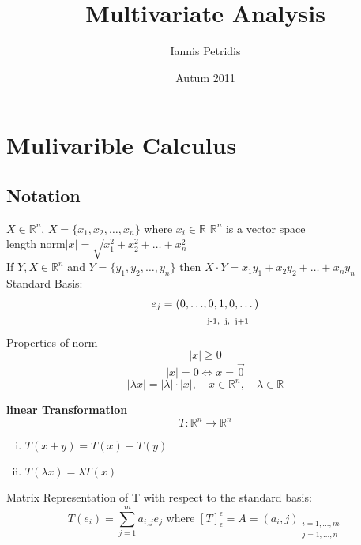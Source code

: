 \documentclass[12pt]{article}
\def\RR{\mathbb{R}}
\begin{document}
\title{Multivariate Analysis}
\author{Iannis Petridis}
\date{Autum 2011}
\maketitle

\tableofcontents
\setcounter{tocdepth}{4}
\newpage

\section{Mulivarible  Calculus}
\subsection{Notation}
$X\in\RR^{n}$, $ X=\{x_{1},x_{2},\dots,x_{n}\}$ where $x_{i}\in\RR$
$\RR^{n}$ is a vector space\\
length norm$|x|=\sqrt{x_1^2 + x_2^2 + \dots +x_n^2 }$\\
If $Y,X\in\RR^{n}$ and $ Y=\{y_{1},y_{2},\dots,y_{n}\}$ then $X \cdot Y=x_{1}y_{1}+ x_{2}y_{2} +\dots + x_{n}y_{n}$\\
Standard Basis:
\begin{align*}
  e_j=(0, \dots &,  0, 1, 0, \dots)\\
& \textrm{ \scriptsize j-1,\: j, \:j+1} 
\end{align*}
Properties of norm
\[|x|\geq0\]
\[|x|=0  \Leftrightarrow x=\vec{0}\]
\[| \lambda x| = | \lambda| \cdot |x| , \quad x \in \RR^n, \quad \lambda \in \RR \]

\textbf{linear Transformation}
\[T:\RR^{n}\rightarrow\RR^{n}\]
\begin{enumerate}[(i)]
\item $ T(x+y)=T(x) + T(y)$
\item $T(\lambda x) =\lambda T(x) $
\end{enumerate}
Matrix Representation of T with respect to the standard basis:\\
\[T(e_i)=\sum_{j=1}^{m}a_{i,j}e_j \textrm{ where } [T]_{\epsilon}^{\epsilon}=A=(a_i,j)_{\substack{i=1,\dots ,m \\ j=1,\dots ,n}}\]
\end{document}
